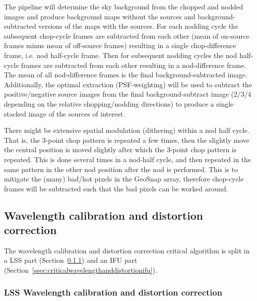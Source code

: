 The pipeline will determine the sky background from the chopped and nodded images and produce background maps without the sources and background-subtracted versions of the maps with the sources.
For each nodding cycle the subsequent chop-cycle frames are subtracted from each other (mean of on-source frames minus mean of off-source frames) resulting in a single chop-difference frame, i.e. nod half-cycle frame.
Then for subsequent nodding cycles the nod half-cycle frames are subtracted from each other resulting in a nod-difference frame.
The mean of all nod-difference frames is the final background-subtracted image.
Additionally, the optimal extraction (PSF-weighting) will be used to subtract the positive/negative source images from the final background-subtract image (2/3/4 depending on the relative chopping/nodding directions) to produce a single stacked image of the sources of interest.

There might be extensive spatial modulation (dithering) within a nod half cycle.
That is, the 3-point chop pattern is repeated a few times, then the slightly move the central position is moved slightly after which the 3-point chop pattern is repeated.
This is done several times in a nod-half cycle, and then repeated in the same pattern in the other nod position after the nod is performed.
This is to mitigate the (many) bad/hot pixels in the GeoSnap array, therefore chop-cycle frames will be subtracted such that the bad pixels can be worked around.

\subsection{Wavelength calibration and distortion correction}\label{ssec:criticalwavelengthanddistortion}
The wavelength calibration and distortion correction critical algorithm is split in a LSS part (Section~\ref{ssec:criticalwavelengthanddistortionlss}) and an IFU part (Section~\ref{ssec:criticalwavelengthanddistortionifu}).

\subsubsection{LSS Wavelength calibration and distortion correction}\label{ssec:criticalwavelengthanddistortionlss}



